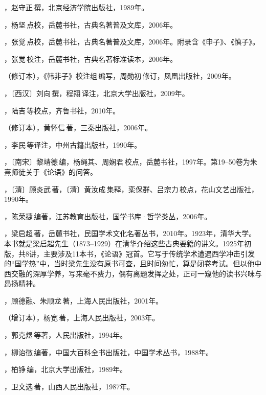 ，赵守正\,撰，北京经济学院出版社，1989年。

，杨坚\,点校，岳麓书社，古典名著普及文库，2006年。

，张觉\,点校，岳麓书社，古典名著普及文库，2006年。附录含《申子》、《慎子》。

，张觉\,校注，岳麓书社，古典名著标准读本，2006年。

（修订本），《韩非子》校注组\,编写，周勋初\,修订，凤凰出版社，2009年。

，〔西汉〕刘向\,撰，程翔\,译注，北京大学出版社，2009年。

，陆吉\,等校点，齐鲁书社，2010年。

（修订本），黄怀信\,著，三秦出版社，2006年。

，李民\,等译注，中州古籍出版社，1990年。

，〔南宋〕黎靖德\,编，杨绳其、周娴君\,校点，岳麓书社，1997年。第19--50卷为朱熹师徒关于《论语》的问答。

，〔清〕顾炎武\,著，〔清〕黄汝成\,集释，栾保群、吕宗力\,校点，花山文艺出版社，1990年。

，陈荣捷\,编著，江苏教育出版社，国学书库·哲学类丛，2006年。

，梁启超\,著，岳麓书社，民国学术文化名著丛书，2010年。1923年，清华大学。本书就是梁启超先生（1873--1929）在清华介绍这些古典要籍的讲义。1925年初版，共8讲，主要涉及11本书，《论语》冠首。它写于传统学术遭遇西学冲击引发的“国学热”中，当时梁先生没有原书可查，且时间匆忙，算是闭卷考试。但以他中西交融的深厚学养，写来毫不费力，偶有离题发挥之处，正可一窥他的读书兴味与昂扬精神。

，顾德融、朱顺龙\,著，上海人民出版社，2001年。

（增订本），杨宽\,著，上海人民出版社，2003年。

，郭克煜\,等著，人民出版社，1994年。

，柳诒徵\,编著，中国大百科全书出版社，中国学术丛书，1988年。

，柏铮\,编，北京大学出版社，1989年。

，卫文选\,著，山西人民出版社，1987年。
